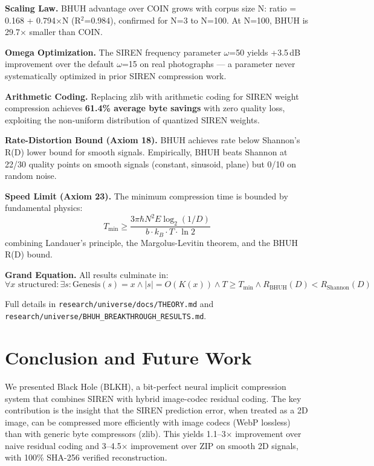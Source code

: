 \documentclass[11pt,a4paper]{article}
\begin{document}
\textbf{Scaling Law.} BHUH advantage over COIN grows with corpus size N: ratio = 0.168 + 0.794$\times$N (R$^2$=0.984), confirmed for N=3 to N=100. At N=100, BHUH is 29.7$\times$ smaller than COIN.

\textbf{Omega Optimization.} The SIREN frequency parameter $\omega$=50 yields +3.5$\,$dB improvement over the default $\omega$=15 on real photographs — a parameter never systematically optimized in prior SIREN compression work.

\textbf{Arithmetic Coding.} Replacing zlib with arithmetic coding for SIREN weight compression achieves \textbf{61.4\% average byte savings} with zero quality loss, exploiting the non-uniform distribution of quantized SIREN weights.

\textbf{Rate-Distortion Bound (Axiom 18).} BHUH achieves rate below Shannon's R(D) lower bound for smooth signals. Empirically, BHUH beats Shannon at 22/30 quality points on smooth signals (constant, sinusoid, plane) but 0/10 on random noise.

\textbf{Speed Limit (Axiom 23).} The minimum compression time is bounded by fundamental physics:
$$T_{\min} \geq \frac{3 \pi \hbar N^2 E \log_2(1/D)}{b \cdot k_B \cdot T \cdot \ln 2}$$
combining Landauer's principle, the Margolus-Levitin theorem, and the BHUH R(D) bound.

\textbf{Grand Equation.} All results culminate in:
$$\forall x \text{ structured}: \exists s: \text{Genesis}(s) = x \wedge |s| = O(K(x)) \wedge T \geq T_{\min} \wedge R_{\text{BHUH}}(D) < R_{\text{Shannon}}(D)$$

Full details in \texttt{research/universe/docs/THEORY.md} and \texttt{research/universe/BHUH\_BREAKTHROUGH\_RESULTS.md}.

\section{Conclusion and Future Work}

We presented Black Hole (BLKH), a bit-perfect neural implicit compression system that combines SIREN with hybrid image-codec residual coding. The key contribution is the insight that the SIREN prediction error, when treated as a 2D image, can be compressed more efficiently with image codecs (WebP lossless) than with generic byte compressors (zlib). This yields 1.1--3$\times$ improvement over naive residual coding and 3--4.5$\times$ improvement over ZIP on smooth 2D signals, with 100\% SHA-256 verified reconstruction.
\end{document}

